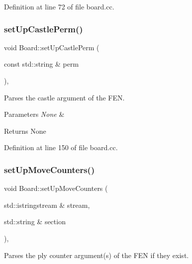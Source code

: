 Definition at line 72 of file board.\+cc.

\mbox{\label{classBoard_acc2461d64efdfd469ec2dcada47c45b0}} 
\subsubsection{\texorpdfstring{set\+Up\+Castle\+Perm()}{setUpCastlePerm()}}
{\footnotesize\ttfamily void Board\+::set\+Up\+Castle\+Perm (\begin{DoxyParamCaption}\item[{const std\+::string \&}]{perm }\end{DoxyParamCaption})\hspace{0.3cm}{\ttfamily [private]}, {\ttfamily [noexcept]}}



Parses the castle argument of the F\+EN. 


\begin{DoxyParams}{Parameters}
{\em None} & \\
\hline
\end{DoxyParams}
\begin{DoxyReturn}{Returns}
None 
\end{DoxyReturn}


Definition at line 150 of file board.\+cc.

\mbox{\label{classBoard_a635ae307c20455554c2cea611c7561f1}} 
\subsubsection{\texorpdfstring{set\+Up\+Move\+Counters()}{setUpMoveCounters()}}
{\footnotesize\ttfamily void Board\+::set\+Up\+Move\+Counters (\begin{DoxyParamCaption}\item[{std\+::istringstream \&}]{stream,  }\item[{std\+::string \&}]{section }\end{DoxyParamCaption})\hspace{0.3cm}{\ttfamily [private]}, {\ttfamily [noexcept]}}



Parses the ply counter argument(s) of the F\+EN if they exist. 


